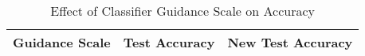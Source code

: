 \begin{table}[h]
\centering
\caption{Effect of Classifier Guidance Scale on Accuracy}
\label{tab:guidance_scale}
\begin{tabular}{ccc}
\toprule
\textbf{Guidance Scale} & \textbf{Test Accuracy} & \textbf{New Test Accuracy} \\
\midrule
\bottomrule
\end{tabular}
\end{table}
